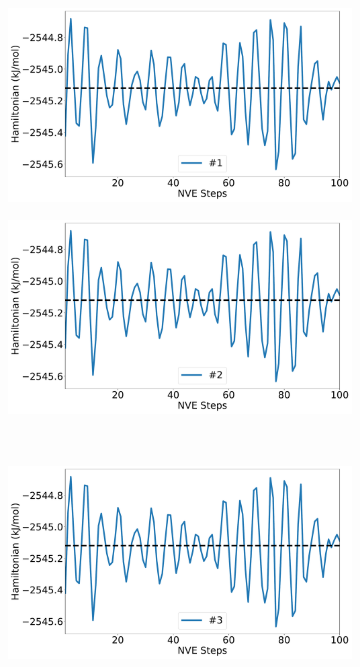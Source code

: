 \begin{figure}[htbp]
\begin{subfigure}{0.48\textwidth}
\includegraphics[width=\linewidth]{figs/drift1.pdf}
\end{subfigure}
\begin{subfigure}{0.48\textwidth}
\includegraphics[width=\linewidth]{figs/drift2.pdf}
\end{subfigure}
\\
\begin{subfigure}{0.48\textwidth}
\includegraphics[width=\linewidth]{figs/drift3.pdf}

\end{subfigure}
\end{figure}
